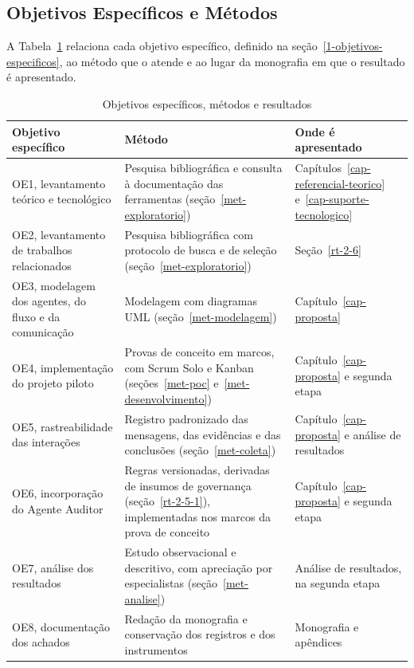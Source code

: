 \subsection{Objetivos Específicos e Métodos}
\label{met-objetivos}

A Tabela~\ref{tab-objetivos-metodos} relaciona cada objetivo específico, definido na seção~\ref{1-objetivos-especificos}, ao método que o atende e ao lugar da monografia em que o resultado é apresentado.

\begin{table}[htbp]
\centering
\caption{Objetivos específicos, métodos e resultados}
\label{tab-objetivos-metodos}
\begingroup
\footnotesize
\SingleSpacing
\renewcommand{\arraystretch}{1.15}
\begin{tabularx}{\textwidth}{>{\raggedright\arraybackslash}p{4.4cm}>{\raggedright\arraybackslash}X>{\raggedright\arraybackslash}p{3.4cm}}
\hline
\textbf{Objetivo específico} & \textbf{Método} & \textbf{Onde é apresentado} \\ \hline
OE1, levantamento teórico e tecnológico & Pesquisa bibliográfica e consulta à documentação das ferramentas (seção~\ref{met-exploratorio}) & Capítulos~\ref{cap-referencial-teorico} e~\ref{cap-suporte-tecnologico} \\ \hline
OE2, levantamento de trabalhos relacionados & Pesquisa bibliográfica com protocolo de busca e de seleção (seção~\ref{met-exploratorio}) & Seção~\ref{rt-2-6} \\ \hline
OE3, modelagem dos agentes, do fluxo e da comunicação & Modelagem com diagramas UML (seção~\ref{met-modelagem}) & Capítulo~\ref{cap-proposta} \\ \hline
OE4, implementação do projeto piloto & Provas de conceito em marcos, com Scrum Solo e Kanban (seções~\ref{met-poc} e~\ref{met-desenvolvimento}) & Capítulo~\ref{cap-proposta} e segunda etapa \\ \hline
OE5, rastreabilidade das interações & Registro padronizado das mensagens, das evidências e das conclusões (seção~\ref{met-coleta}) & Capítulo~\ref{cap-proposta} e análise de resultados \\ \hline
OE6, incorporação do Agente Auditor & Regras versionadas, derivadas de insumos de governança (seção~\ref{rt-2-5-1}), implementadas nos marcos da prova de conceito & Capítulo~\ref{cap-proposta} e segunda etapa \\ \hline
OE7, análise dos resultados & Estudo observacional e descritivo, com apreciação por especialistas (seção~\ref{met-analise}) & Análise de resultados, na segunda etapa \\ \hline
OE8, documentação dos achados & Redação da monografia e conservação dos registros e dos instrumentos & Monografia e apêndices \\ \hline
\end{tabularx}
\endgroup
{}
\end{table}

